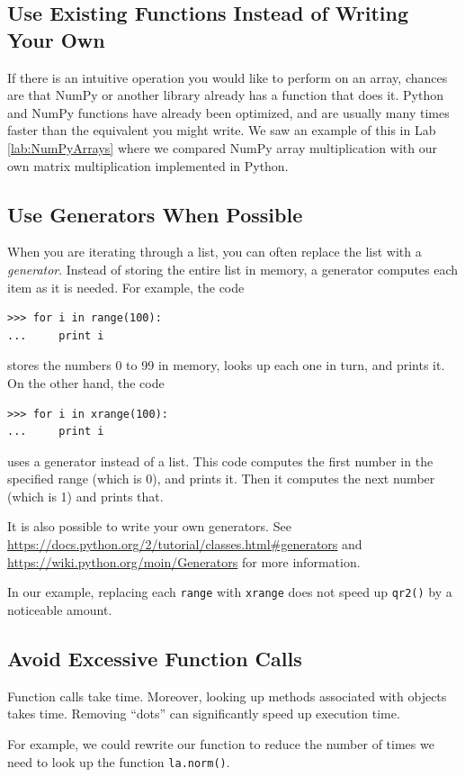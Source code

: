\subsection*{Use Existing Functions Instead of Writing Your Own}
If there is an intuitive operation you would like to perform on an array, chances are that NumPy or another library already has a function that does it.
Python and NumPy functions have already been optimized, and are usually many times faster than the equivalent you might write.
We saw an example of this in Lab \ref{lab:NumPyArrays} where we compared NumPy array multiplication with our own matrix multiplication implemented in Python.

\subsection*{Use Generators When Possible}
When you are iterating through a list, you can often replace the list with a \emph{generator}.
Instead of storing the entire list in memory, a generator computes each item as it is needed. 
For example, the code
\begin{lstlisting}
>>> for i in range(100):
...     print i
\end{lstlisting}
stores the numbers 0 to 99 in memory, looks up each one in turn, and prints it. 
On the other hand, the code
\begin{lstlisting}
>>> for i in xrange(100):
...     print i
\end{lstlisting}
uses a generator instead of a list. 
This code computes the first number in the specified range (which is 0), and prints it.
Then it computes the next number (which is 1) and prints that.

It is also possible to write your own generators. 
See \url{https://docs.python.org/2/tutorial/classes.html#generators} and \url{https://wiki.python.org/moin/Generators} for more information.

In our example, replacing each \texttt{range} with \texttt{xrange} does not speed up \texttt{qr2()} by a noticeable amount.

\subsection*{Avoid Excessive Function Calls}
Function calls take time.
Moreover, looking up methods associated with objects takes time.
Removing ``dots'' can significantly speed up execution time.

For example, we could rewrite our function to reduce the number of times we need to look up the function \texttt{la.norm()}.

